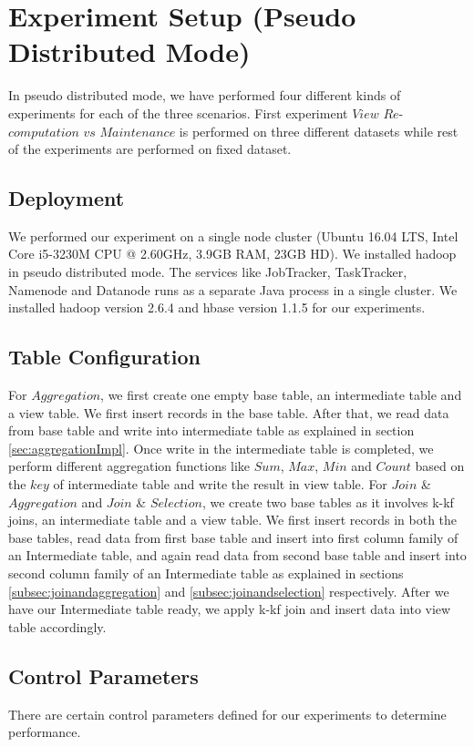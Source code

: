 \documentclass[11pt,a4paper,bibtotoc,idxtotoc,headsepline,footsepline,footexclude,BCOR12mm,DIV13]{scrbook}
\begin{document}
\section{Experiment Setup (Pseudo Distributed Mode)}
In pseudo distributed mode, we have performed four different kinds of experiments for each of the three scenarios. First experiment $View$ $Re$-$computation$ $vs$ $Maintenance$ is performed on three different datasets while rest of the experiments are performed on fixed dataset.

\subsection{Deployment}
We performed our experiment on a single node cluster (Ubuntu 16.04 LTS, Intel Core i5-3230M CPU @ 2.60GHz, 3.9GB RAM, 23GB HD). We installed hadoop in pseudo distributed mode. The services like JobTracker, TaskTracker, Namenode and Datanode runs as a separate Java process in a single cluster. We installed hadoop version 2.6.4 and hbase version 1.1.5 for our experiments.

\subsection{Table Configuration}
\label{Table Configuration standalone}
For $Aggregation$, we first create one empty base table, an intermediate table and a view table. We first insert records in the base table. After that, we read data from base table and write into intermediate table as explained in section \ref{sec:aggregationImpl}. Once write in the intermediate table is completed, we perform different aggregation functions like $Sum$, $Max$, $Min$ and $Count$ based on the $key$ of intermediate table and write the result in view table.
\linebreak
\linebreak
For $Join$ \& $Aggregation$ and $Join$ \& $Selection$, we create two base tables as it involves k-kf joins, an intermediate table and a view table. We first insert records in both the base tables, read data from first base table and insert into first column family of an Intermediate table, and again read data from second base table and insert into second column family of an Intermediate table as explained in sections \ref{subsec:joinandaggregation} and \ref{subsec:joinandselection} respectively. After we have our Intermediate table ready, we apply k-kf join and insert data into view table accordingly.

\subsection{Control Parameters}
\label{Control Parameter}
There are certain control parameters defined for our experiments to determine performance.
\end{document}
